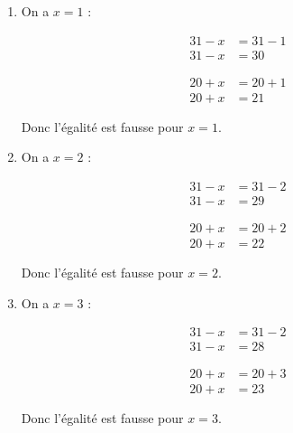 \documentclass[12pt,a4paper]{article}
\begin{document}
\begin{enumerate}
	\item On a $x=1$ :
	
	\vspace*{-1cm}
	
	\begin{multicols}{2}
		\begin{align*}
			31 - x &= 31 - 1 \\
			31 - x &= 30 %
		\end{align*}
		
		\begin{align*}
			20 + x &= 20 + 1 \\
			20 + x &= 21 %
		\end{align*}
	\end{multicols}
	
	
	Donc l'égalité est fausse pour $x=1$.
	
	\item On a $x=2$ :
	
	\vspace*{-1cm}
	
	\begin{multicols}{2}
		\begin{align*}
			31 - x &= 31 - 2 \\
			31 - x &= 29 %
		\end{align*}
		
		\begin{align*}
			20 + x &= 20 + 2 \\
			20 + x &= 22 %
		\end{align*}
	\end{multicols}
	
	
	Donc l'égalité est fausse pour $x=2$.
	
	
	\item On a $x=3$ :
	
	\vspace*{-1cm}
	
	\begin{multicols}{2}
		\begin{align*}
			31 - x &= 31 - 2 \\
			31 - x &= 28 %
		\end{align*}
			
		\begin{align*}
			20 + x &= 20 + 3 \\
			20 + x &= 23 %
		\end{align*}
	\end{multicols}

	
	Donc l'égalité est fausse pour $x=3$.
	
	
	
\end{enumerate}
\end{document}
